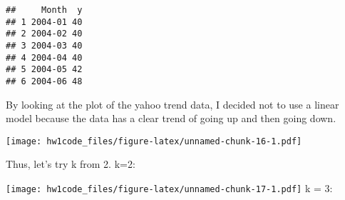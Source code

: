 \documentclass[
]{article}
\newenvironment{Shaded}{\begin{snugshade}}{\end{snugshade}}
\newcommand{\AttributeTok}[1]{\textcolor[rgb]{0.77,0.63,0.00}{#1}}
\newcommand{\CommentTok}[1]{\textcolor[rgb]{0.56,0.35,0.01}{\textit{#1}}}
\newcommand{\DecValTok}[1]{\textcolor[rgb]{0.00,0.00,0.81}{#1}}
\newcommand{\FunctionTok}[1]{\textcolor[rgb]{0.00,0.00,0.00}{#1}}
\newcommand{\NormalTok}[1]{#1}
\newcommand{\OtherTok}[1]{\textcolor[rgb]{0.56,0.35,0.01}{#1}}
\newcommand{\SpecialCharTok}[1]{\textcolor[rgb]{0.00,0.00,0.00}{#1}}
\newcommand{\StringTok}[1]{\textcolor[rgb]{0.31,0.60,0.02}{#1}}
\begin{document}
\begin{verbatim}
##     Month  y
## 1 2004-01 40
## 2 2004-02 40
## 3 2004-03 40
## 4 2004-04 40
## 5 2004-05 42
## 6 2004-06 48
\end{verbatim}

\begin{Shaded}
\end{Shaded}

By looking at the plot of the yahoo trend data, I decided not to use a
linear model because the data has a clear trend of going up and then
going down.

\begin{Shaded}
\end{Shaded}

\texttt{[image: hw1code\_files/figure-latex/unnamed-chunk-16-1.pdf]}

Thus, let's try k from 2. k=2:

\begin{Shaded}
\end{Shaded}

\texttt{[image: hw1code\_files/figure-latex/unnamed-chunk-17-1.pdf]} k =
3:
\end{document}
